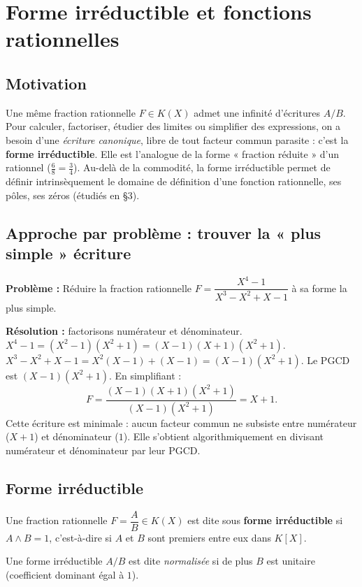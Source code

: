 \section{Forme irréductible et fonctions rationnelles}

\subsection{Motivation}
Une même fraction rationnelle $F \in K(X)$ admet une infinité d'écritures $A/B$. Pour calculer, factoriser, étudier des limites ou simplifier des expressions, on a besoin d'une \emph{écriture canonique}, libre de tout facteur commun parasite : c'est la \textbf{forme irréductible}. Elle est l'analogue de la forme « fraction réduite » d'un rationnel ($\frac{6}{8} = \frac{3}{4}$). Au-delà de la commodité, la forme irréductible permet de définir intrinsèquement le domaine de définition d'une fonction rationnelle, ses pôles, ses zéros (étudiés en §3).

\subsection{Approche par problème : trouver la « plus simple » écriture}
\textbf{Problème :} Réduire la fraction rationnelle $F = \dfrac{X^4 - 1}{X^3 - X^2 + X - 1}$ à sa forme la plus simple.

\textbf{Résolution :} factorisons numérateur et dénominateur.
$X^4 - 1 = (X^2 - 1)(X^2 + 1) = (X - 1)(X + 1)(X^2 + 1)$.
$X^3 - X^2 + X - 1 = X^2(X - 1) + (X - 1) = (X - 1)(X^2 + 1)$.
Le PGCD est $(X - 1)(X^2 + 1)$. En simplifiant :
\[ F = \frac{(X - 1)(X + 1)(X^2 + 1)}{(X - 1)(X^2 + 1)} = X + 1. \]
Cette écriture est minimale : aucun facteur commun ne subsiste entre numérateur ($X + 1$) et dénominateur ($1$). Elle s'obtient algorithmiquement en divisant numérateur et dénominateur par leur PGCD.

\subsection{Forme irréductible}

\begin{definition}
Une fraction rationnelle $F = \dfrac{A}{B} \in K(X)$ est dite sous \textbf{forme irréductible} si $A \wedge B = 1$, c'est-à-dire si $A$ et $B$ sont premiers entre eux dans $K[X]$.

Une forme irréductible $A/B$ est dite \emph{normalisée} si de plus $B$ est unitaire (coefficient dominant égal à $1$).
\end{definition}

